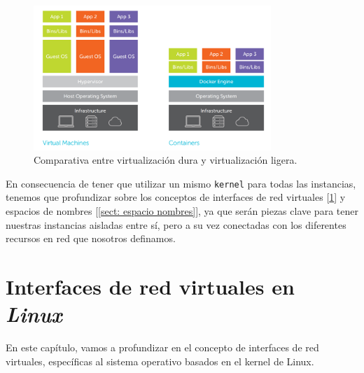 \documentclass[a4paper, oneside, 12pt]{book}
\begin{document}
	
	\begin{figure}[h!]
		\begin{center}
			\includegraphics[width=0.8\textwidth]{img/virtualization_comparative_2.png}
			\caption{Comparativa entre virtualización dura y virtualización ligera.}
			\label{img: virtualization comparative}
		\end{center}
	\end{figure}
	
	\noindent En consecuencia de tener que utilizar un mismo \texttt{kernel} para todas las instancias, tenemos que profundizar sobre los conceptos de interfaces de red virtuales [\ref{sect: interfaces virtuales}] y espacios de nombres [\ref{sect: espacio nombres}], ya que serán piezas clave para tener nuestras instancias aisladas entre sí, pero a su vez conectadas con los diferentes recursos en red que nosotros definamos.
	
	\pagebreak
	
	\chapter{Interfaces de red virtuales en \textit{Linux}}
	\label{sect: interfaces virtuales}
	\noindent En este capítulo, vamos a profundizar en el concepto de interfaces de red virtuales, específicas al sistema operativo basados en el kernel de Linux. \\
	
\end{document}
